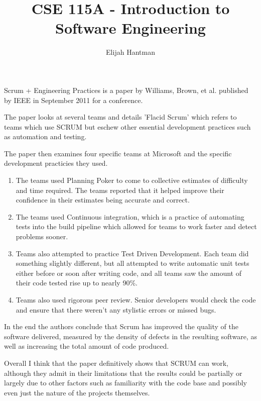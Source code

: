 \documentclass{report}
\title{\Huge{CSE 115A - Introduction to Software Engineering}}
\author{\huge{Elijah Hantman}}
\date{}
\begin{document}
\maketitle
\newpage

Scrum + Engineering Practices is a paper by Williams,
Brown, et al. published by IEEE in September 2011 for
a conference.

The paper looks at several teams and details 'Flacid Scrum'
which refers to teams which use SCRUM but eschew other essential
development practices such as automation and testing.

The paper then examines four specific teams at Microsoft
and the specific development practicies they used.

\begin{enumerate}
    \item The teams used Planning Poker to come to collective
        estimates of difficulty and time required. The teams
        reported that it helped improve their confidence in
        their estimates being accurate and correct.
    \item The teams used Continuous integration, which is
        a practice of automating tests into the build pipeline
        which allowed for teams to work faster and detect problems
        sooner.
    \item Teams also attempted to practice Test Driven Development.
        Each team did something slightly different, but all attempted
        to write automatic unit tests either before or soon
        after writing code, and all teams saw the amount of their
        code tested rise up to nearly 90\%.
    \item Teams also used rigorous peer review. Senior developers
        would check the code and ensure that there weren't any
        stylistic errors or missed bugs.
\end{enumerate}

In the end the authors conclude that Scrum has improved the quality
of the software delivered, measured by the density of defects
in the resulting software, as well as increasing the total amount
of code produced.

Overall I think that the paper definitively shows that SCRUM
can work, although they admit in their limitations that
the results could be partially or largely due to other
factors such as familiarity with the code base and
possibly even just the nature of the projects themselves.
\end{document}
